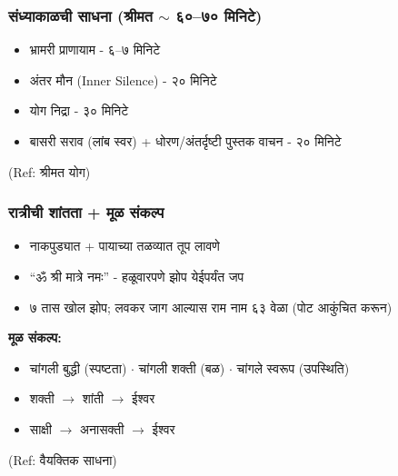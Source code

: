 \begin{frame}[fragile]\frametitle{संध्याकाळची साधना (श्रीमत $\sim$ ६०--७० मिनिटे)}

	\begin{itemize}
	\item भ्रामरी प्राणायाम - ६--७ मिनिटे
	\item अंतर मौन (Inner Silence) - २० मिनिटे
	\item योग निद्रा - ३० मिनिटे
	\item बासरी सराव (लांब स्वर) + धोरण/अंतर्दृष्टी पुस्तक वाचन - २० मिनिटे
	\end{itemize}

{\tiny (Ref: श्रीमत योग)}

\end{frame}

\begin{frame}[fragile]\frametitle{रात्रीची शांतता + मूळ संकल्प}

	\begin{itemize}
	\item नाकपुड्यात + पायाच्या तळव्यात तूप लावणे
	\item ``ॐ श्री मात्रे नमः'' - हळूवारपणे झोप येईपर्यंत जप
	\item ७ तास खोल झोप; लवकर जाग आल्यास राम नाम ६३ वेळा (पोट आकुंचित करून)
	\end{itemize}

	\vspace{3mm}
	\textbf{मूळ संकल्प:}
	\begin{itemize}
	\item चांगली बुद्धी (स्पष्टता) $\cdot$ चांगली शक्ती (बळ) $\cdot$ चांगले स्वरूप (उपस्थिति)
	\item शक्ती $\rightarrow$ शांती $\rightarrow$ ईश्वर
	\item साक्षी $\rightarrow$ अनासक्ती $\rightarrow$ ईश्वर
	\end{itemize}

{\tiny (Ref: वैयक्तिक साधना)}

\end{frame}
